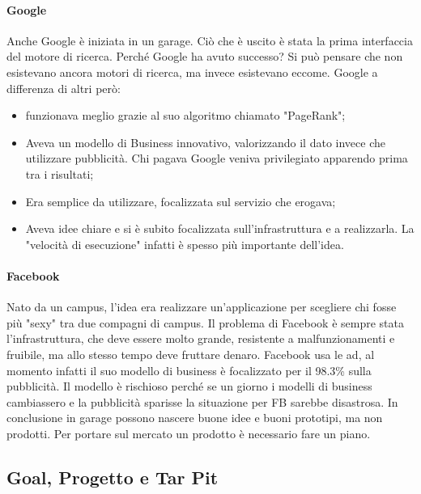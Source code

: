 \paragraph{Google}
Anche Google è iniziata in un garage. Ciò che è uscito è stata la prima interfaccia del motore di ricerca. Perché Google ha avuto successo? Si può pensare che non esistevano ancora motori di ricerca, ma invece esistevano eccome.\newline
Google a differenza di altri però:
\begin{itemize}
	\item funzionava meglio grazie al suo algoritmo chiamato "PageRank";
	\item Aveva un modello di Business innovativo, valorizzando il dato invece che utilizzare pubblicità. Chi pagava Google veniva privilegiato apparendo prima tra i risultati;
	\item Era semplice da utilizzare, focalizzata sul servizio che erogava;
	\item Aveva idee chiare e si è subito focalizzata sull'infrastruttura e a realizzarla. La "velocità di esecuzione" infatti è spesso più importante dell'idea.
\end{itemize}
\paragraph{Facebook}
Nato da un campus, l'idea era realizzare un'applicazione per scegliere chi fosse più "sexy" tra due compagni di campus. Il problema di Facebook è sempre stata l'infrastruttura, che deve essere molto grande, resistente a malfunzionamenti e fruibile, ma allo stesso tempo deve fruttare denaro. Facebook usa le ad, al momento infatti il suo modello di business è focalizzato per il 98.3\% sulla pubblicità. Il modello è rischioso perché se un giorno i modelli di business cambiassero e la pubblicità sparisse la situazione per FB sarebbe disastrosa.\newline\newline
In conclusione in garage possono nascere buone idee e buoni prototipi, ma non prodotti. Per portare sul mercato un prodotto è necessario fare un piano.
\subsection{Goal, Progetto e Tar Pit}
